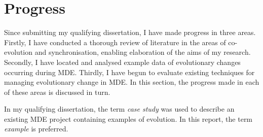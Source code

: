 \section{Progress}
Since submitting my qualifying dissertation, I have made progress in three areas. Firstly, I have conducted a thorough review of literature in the areas of co-evolution and synchronisation, enabling elaboration of the aims of my research. Secondly, I have located and analysed example data of evolutionary changes occurring during MDE. Thirdly, I have begun to evaluate existing techniques for managing evolutionary change in MDE. In this section, the progress made in each of these areas is discussed in turn.

In my qualifying dissertation, the term \emph{case study} was used to describe an existing MDE project containing examples of evolution. In this report, the term \emph{example} is preferred.




